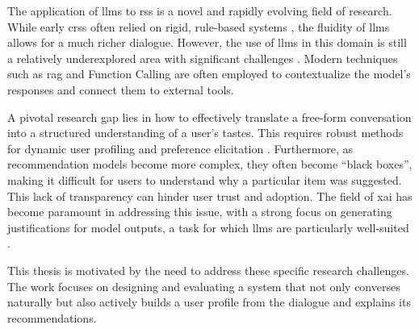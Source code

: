 The application of \acp{llm} to \aclp{rs} is a novel and rapidly evolving field of research. While early \acp{crs} often relied on rigid, rule-based systems \cite{SOTA-CRS}, the fluidity of \acp{llm} allows for a much richer dialogue. However, the use of \acp{llm} in this domain is still a relatively underexplored area with significant challenges \cite{SOTA-CRS-LLM, BOOK:RS-HANDBOOK}. Modern techniques such as \ac{rag} \cite{SOTA-RAG-SURVEY} and Function Calling are often employed to contextualize the model's responses and connect them to external tools.

A pivotal research gap lies in how to effectively translate a free-form conversation into a structured understanding of a user's tastes. This requires robust methods for dynamic user profiling and preference elicitation \cite[Conversational Preference Elicitation]{CHAPTER:RS-HANDBOOK-NLP}. Furthermore, as recommendation models become more complex, they often become ``black boxes'', making it difficult for users to understand why a particular item was suggested. This lack of transparency can hinder user trust and adoption. The field of \ac{xai} has become paramount in addressing this issue, with a strong focus on generating justifications for model outputs, a task for which \acp{llm} are particularly well-suited \cite[Generating Textual Explanations]{CHAPTER:RS-HANDBOOK-NLP, SOTA-RECSYS-EXPLAIN}.

This thesis is motivated by the need to address these specific research challenges. The work focuses on designing and evaluating a system that not only converses naturally but also actively builds a user profile from the dialogue and explains its recommendations.